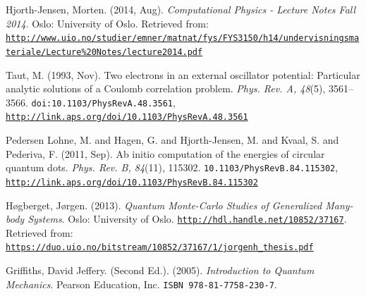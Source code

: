 \documentclass[a4paper,twoside,11pt]{book}
\begin{document}
\begin{thebibliography}{9}

  Hjorth-Jensen, Morten.
  (2014, Aug).
  \emph{Computational Physics - Lecture Notes Fall 2014}.
  Oslo: University of Oslo.
  Retrieved from: \texttt{\url{http://www.uio.no/studier/emner/matnat/fys/FYS3150/h14/undervisningsmateriale/Lecture\%20Notes/lecture2014.pdf}}

  Taut, M.
  (1993, Nov).
  Two electrons in an external oscillator potential: Particular analytic solutions of a Coulomb correlation problem.
  \emph{Phys. Rev. A, 48}(5),
  {3561--3566}.
  \texttt{doi:10.1103/PhysRevA.48.3561},
  \texttt{\url{http://link.aps.org/doi/10.1103/PhysRevA.48.3561}}

  Pedersen Lohne, M. and Hagen, G. and Hjorth-Jensen, M. and Kvaal, S. and Pederiva, F.
  (2011, Sep).
  Ab initio computation of the energies of circular quantum dots.
  \emph{Phys. Rev. B, 84}(11),
  {115302}.
  \texttt{10.1103/PhysRevB.84.115302},
  \texttt{\url{http://link.aps.org/doi/10.1103/PhysRevB.84.115302}}

  Høgberget, Jørgen.
  (2013).
  \emph{Quantum Monte-Carlo Studies of Generalized Many-body Systems}.
  Oslo: University of Oslo.
  \texttt{\url{http://hdl.handle.net/10852/37167}}.
  Retrieved from: \texttt{\url{https://duo.uio.no/bitstream/10852/37167/1/jorgenh_thesis.pdf}}
  
  Griffiths, David Jeffery.
  (Second Ed.).
  (2005).
  \emph{Introduction to Quantum Mechanics}.
  Pearson Education, Inc.
  \texttt{ISBN 978-81-7758-230-7}.

\end{thebibliography}
\end{document}
